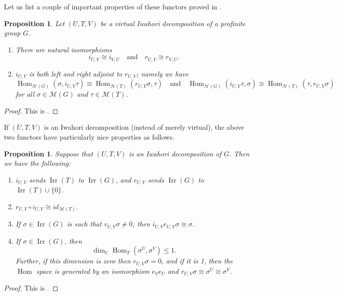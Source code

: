 \documentclass[10pt, letterpaper]{amsart}
\theoremstyle{plain}
\newtheorem{Prop}[equation]{Proposition}
\theoremstyle{definition}
\numberwithin{equation}{section}
\newcommand{\C}{\mathbb{C}}
\newcommand{\Irr}{\operatorname{Irr}}
\newcommand{\Hom}{\operatorname{Hom}}
\newcommand{\Hcal}{\mathcal{H}}
\newcommand{\qand}{{\quad\text{and}\quad}}
\begin{document}
Let us list a couple of important properties of these functors proved in \cite{CMO19,D09}.
\begin{Prop}\label{P:two_functions_are_adjoint}
Let $(U, T, V)$ be a virtual Iwahori decomposition of a profinite group $G$. 
\begin{enumerate}[(1)]
\item There are natural isomorphisms 
\[
i_{U, V}\cong i_{V, U}\qand r_{U, V}\cong r_{V, U}.
\]
\item $i_{U, V}$ is both left and right adjoint to $r_{U, V}$; namely we have
\[
\Hom_{\Hcal(G)}(\sigma, i_{U, V}\tau)\cong \Hom_{\Hcal(T)}(r_{U, V}\sigma, \tau)
\qand
\Hom_{\Hcal(G)}(i_{U, V}\tau, \sigma)\cong\Hom_{\Hcal(T)}(\tau, r_{U,V}\sigma)
\]
for all $\sigma\in\mathcal{M}(G)$ and $\tau\in\mathcal{M}(T)$.
\end{enumerate}
\end{Prop}
\begin{proof}
    This is \cite[Theorem 2.18 (1), (2) and (3)]{CMO19}.
\end{proof}



If $(U, T, V)$ is an Iwahori decomposition (instead of merely virtual), the above two functors have particularly nice properties as follows.
\begin{Prop}\label{P:two_functors_for_Iwahori_decomp}
Suppose that $(U, T, V)$ is an Iwahori decomposition of $G$. Then we have the following:
\begin{enumerate}[(1)]
\item $i_{U, V}$ sends $\Irr(T)$ to $\Irr(G)$, and $r_{U, V}$ sends $\Irr(G)$ to $\Irr(T)\cup\{0\}$.
\item $r_{U, V}\circ i_{U, V}\cong id_{\mathcal{M}(T)}$.\label{P:two_functors_for_Iwahori_decomp2}
\item If $\sigma\in\Irr(G)$ is such that $r_{U, V}\sigma\neq 0$, then $i_{U, V}r_{U, V}\sigma\cong\sigma$.
\item If $\sigma\in\Irr(G)$, then
\[
\dim_{\C}\Hom_T(\sigma^U, \sigma^V)\leq 1.
\]
Further, if this dimension is zero then $r_{U, V}\sigma=0$, and if it is 1, then the $\Hom$ space is generated by an isomorphism $e_Ve_U$ and $r_{U, V}\sigma\cong\sigma^U\cong\sigma^V$.
\end{enumerate}
\end{Prop}
\begin{proof}
This is \cite[Theorem 2.23]{CMO19}.
\end{proof}
\end{document}
